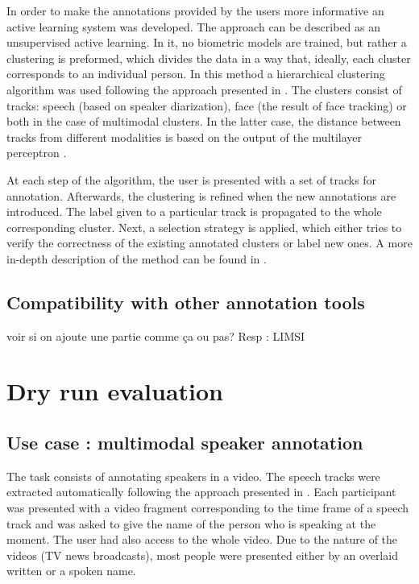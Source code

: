 \documentclass[a4paper]{article}
\begin{document}
In order to make the annotations provided by the users more informative an active learning system 
was developed. The approach can be described as an unsupervised active learning. In it, no biometric models are trained, but rather a clustering is preformed,
which divides the data in a way that, ideally, each cluster corresponds to an individual person.  In this method a hierarchical clustering algorithm was used 
following the  approach presented in \cite{poignant2012unsupervised}.  The clusters consist of tracks: speech (based on speaker diarization),  face (the result of face tracking) or both in the case of multimodal clusters. In the latter case, the distance between tracks from different modalities is based on the output of the multilayer perceptron \cite{bredin2012fusion}.

At each step of the algorithm, the user is presented with a set of tracks for annotation. Afterwards, the clustering is refined when the new annotations are introduced.
The label given to a particular track is propagated to the whole corresponding cluster. Next, a selection strategy is applied, which either tries to verify the correctness of the existing annotated clusters or label new ones.
A more in-depth description of the method can be found in \cite{budnik2014automatic}.

      \subsection{Compatibility with other annotation tools}
voir si on ajoute une partie comme ça ou pas?
Resp : LIMSI



  \section{Dry run evaluation}
      \subsection{Use case : multimodal speaker annotation}
     

The task consists of annotating speakers in a video. The speech tracks were extracted automatically following the approach presented in \cite{barras2006multistage}.
Each participant was presented with a video fragment corresponding to the time frame of a speech track and was asked to give the name of the person who is speaking at the moment.
The user had also  access to the whole video. Due to the nature of the videos (TV news broadcasts), most people were presented either by an overlaid written or a spoken name.
 
\end{document}
